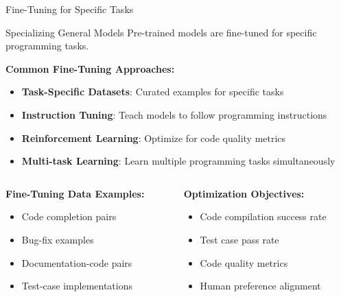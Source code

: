 \documentclass{beamer}
\begin{document}
\begin{frame}[t]{Fine-Tuning for Specific Tasks}
    \begin{block}{Specializing General Models}
        Pre-trained models are fine-tuned for specific programming tasks.
    \end{block}
    
    \textbf{Common Fine-Tuning Approaches:}
    \begin{itemize}
        \item \textbf{Task-Specific Datasets}: Curated examples for specific tasks
        \item \textbf{Instruction Tuning}: Teach models to follow programming instructions
        \item \textbf{Reinforcement Learning}: Optimize for code quality metrics
        \item \textbf{Multi-task Learning}: Learn multiple programming tasks simultaneously
    \end{itemize}
    
    \begin{columns}[t]
        \begin{column}{0.5\textwidth}
            \textbf{Fine-Tuning Data Examples:}
            \begin{itemize}
                \item Code completion pairs
                \item Bug-fix examples
                \item Documentation-code pairs
                \item Test-case implementations
            \end{itemize}
        \end{column}
        \begin{column}{0.5\textwidth}
            \textbf{Optimization Objectives:}
            \begin{itemize}
                \item Code compilation success rate
                \item Test case pass rate
                \item Code quality metrics
                \item Human preference alignment
            \end{itemize}
        \end{column}
    \end{columns}
\end{frame}
\end{document}
